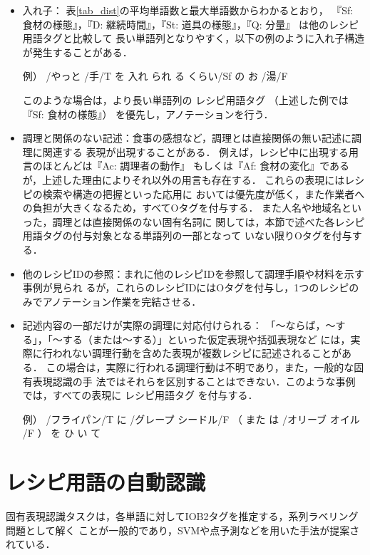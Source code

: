 \documentclass[japanese]{jnlp_1.4}
\begin{document}
\begin{itemize}
 \item 入れ子：
表\ref{tab_dist}の平均単語数と最大単語数からわかるとおり，
『Sf: 食材の様態』，『D: 継続時間』，『St: 道具の様態』，『Q: 分量』
は他のレシピ用語タグと比較して
長い単語列となりやすく，以下の例のように入れ子構造が発生することがある．

\quad \noindent 例） /やっと /手/T を 入れ られ る くらい/Sf の お /湯/F

このような場合は，より長い単語列の
レシピ用語タグ
（上述した例では『Sf: 食材の様態』）
       を優先し，アノテーションを行う．
 \item 調理と関係のない記述：食事の感想など，調理とは直接関係の無い記述に調理に関連する
       表現が出現することがある．
       例えば，レシピ中に出現する用言のほとんどは『Ac: 調理者の動作』
       もしくは『Af: 食材の変化』であるが，上述した理由によりそれ以外の用言も存在する．
       これらの表現にはレシピの検索や構造の把握といった応用に
       おいては優先度が低く，また作業者への負担が大きくなるため，すべてOタグを付与する．
       また人名や地域名といった，調理とは直接関係のない固有名詞に
       関しては，本節で述べた各レシピ用語タグの付与対象となる単語列の一部となって
       いない限りOタグを付与する．
 \item 他のレシピIDの参照：まれに他のレシピIDを参照して調理手順や材料を示す事例が見られ
       るが，これらのレシピIDにはOタグを付与し，1つのレシピのみでアノテーション作業を完結させる．
 \item 記述内容の一部だけが実際の調理に対応付けられる：
       「〜ならば，〜する」，「〜する（または〜する）」といった仮定表現や括弧表現など
       には，実際に行われない調理行動を含めた表現が複数レシピに記述されることがある．
       この場合は，実際に行われる調理行動は不明であり，また，一般的な固有表現認識の手
       法ではそれらを区別することはできない．このような事例では，すべての表現に
レシピ用語タグ
を付与する．

\quad \noindent 例） /フライパン/T に /グレープ シードル/F （ また は /オリーブ オイル
       /F ） を ひ い て
\end{itemize}



\section{レシピ用語の自動認識}

固有表現認識タスクは，各単語に対してIOB2タグを推定する，系列ラベリング問題として解く
ことが一般的であり，SVMや点予測などを用いた手法が提案されている\cite{Support.Vector.Machineを用いた日本語固有表現抽出,A.Machine.Learning.Approach.to.Recipe.Text.Processing}．
\end{document}
